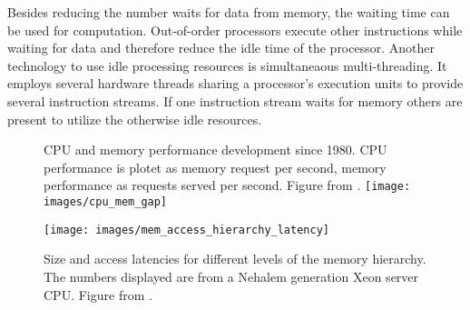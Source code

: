 Besides reducing the number waits for data from memory, the waiting time can be
used for computation.
Out-of-order processors execute other instructions while waiting for data and
therefore reduce the idle time of the processor.
Another technology to use idle processing resources is simultaneaous
multi-threading.
It employs several hardware threads sharing a processor's execution units to
provide several instruction streams.
If one instruction stream waits for memory others are present to utilize the
otherwise idle resources.
%
\begin{figure}[h]
  \setcapindent*{1em}
  \begin{captionbeside}
    {CPU and memory performance development since 1980.
      CPU performance is plotet as memory request per second, memory
      performance as requests served per second.
      Figure from \cite[73]{hennessy_computer_2012}.}
    \texttt{[image: images/cpu\_mem\_gap]}
  \end{captionbeside}
  \label{intro:fig:cpuMemGap}
\end{figure}
%
\begin{comment}
To reduce the number of waits and obscure the gap, several levels of caches
are present on today's processors, thus decreasing the impact of memory latency.
The drawback of several layers of caches and increasing size of caches is the
access latency and the additional cost for a cache miss, when the data
requested is not in any cache layer.
Each cache level adds the time it takes to search it, to the overall
time it takes to request the data from memory.
Thus, three cache levels cost search time for the first, second, and third plus
the memory latency.
In short, larger caches decrease the miss probability, but increase the overall
memory access latency.
Figure \ref{into:fig:accessLatencies} provides and overview over size and
access times for the memory hierarchy.
The displayed access times describe the duration from issuing the request until
receiving the data.
\end{comment}
%
\begin{figure}[h]
  \texttt{[image: images/mem\_access\_hierarchy\_latency]}
  \caption{Size and access latencies for different levels of the
    memory hierarchy.
    The numbers displayed are from a Nehalem generation
    Xeon\texttrademark{} server CPU.
    Figure from \cite[72]{hennessy_computer_2012}.}
  \label{intro:fig:accessLatencies}
\end{figure}
